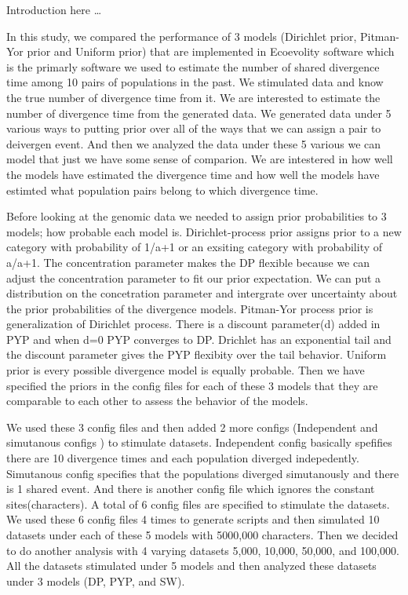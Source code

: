 Introduction here \ldots

In this study, we compared the performance of 3 models (Dirichlet prior, Pitman-Yor prior and Uniform prior) 
that are implemented in Ecoevolity software which is the primarly software we used to estimate the number of shared divergence time among 10 pairs of
 populations in the past. We stimulated data and know the true number of divergence time from it. We are interested to estimate the number of 
divergence time from the generated data. We generated data under 5 various ways to putting prior over all of the ways that we can assign a pair to deivergen event. And then we analyzed the data under these 5 various we can model that just we have some sense of comparion. We are intestered in how well 
the models have estimated the divergence time and how well the models have estimted what population pairs belong to which divergence time. 

Before looking at the genomic data we needed to assign prior probabilities to 3 models; how probable each model is. Dirichlet-process prior assigns prior 
to a new category with probability of 1/a+1 or an exsiting category with probability of a/a+1. The concentration parameter makes the DP flexible
because we can adjust the concentration parameter to fit our prior expectation. We can put a distribution on the concetration parameter and intergrate 
over uncertainty about the prior probabilities of the divergence models. Pitman-Yor process prior is generalization of Dirichlet process. 
There is a discount parameter(d) added in PYP and when d=0 PYP converges to DP. Drichlet has an exponential tail and the discount parameter gives the PYP flexibity
over the tail behavior. Uniform prior is every possible divergence model is equally probable. Then we have specified the priors in the config files
for each of these 3 models that they are comparable to each other to assess the behavior of the models. 

We used these 3 config files and then added 2 more configs (Independent and simutanous configs ) to stimulate datasets. Independent config basically spefifies 
there are 10 divergence times and each population diverged indepedently. Simutanous config specifies that the populations diverged simutanously and 
there is 1 shared event. And there is another config file which ignores the constant sites(characters). A total of 6 config files are specified to 
stimulate the datasets. We used these 6 config files 4 times to generate scripts and then simulated 10 datasets under each of these 5 models with 5000,000
characters. Then we decided to do another analysis with 4 varying datasets 5,000, 10,000, 50,000, and 100,000. All the datasets stimulated under 5 models 
and then analyzed these datasets under 3 models (DP, PYP, and SW).

 
 
      

